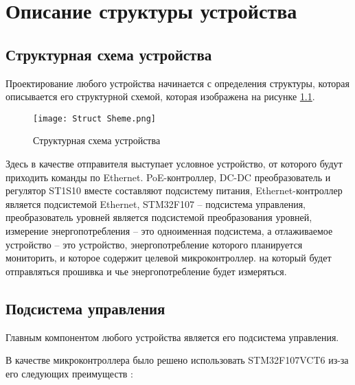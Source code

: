 
\chapter{Описание структуры устройства}

\section{Структурная схема устройства}
\hspace{1cm}

Проектирование любого устройства начинается с определения структуры, которая описывается
его структурной схемой, которая изображена
на рисунке \ref{ris:261}.

\begin{figure}[H]
  \centering
  \texttt{[image: Struct Sheme.png]}
  \caption{Структурная схема устройства}
  \label{ris:261}
\end{figure}

Здесь в качестве отправителя выступает условное устройство, от которого будут приходить
команды по Ethernet. PoE-контроллер, DC-DC преобразователь и регулятор ST1S10 вместе составляют 
подсистему питания,
Ethernet-контроллер является подсистемой Ethernet, STM32F107 -- подсистема управления, 
преобразователь уровней является подсистемой преобразования уровней, измерение энергопотребления --
это одноименная подсистема, а отлаживаемое устройство -- это устройство, энергопотребление которого
планируется мониторить, и которое содержит целевой микроконтроллер.
на который будет отправляться прошивка и чье энергопотребление будет измеряться.

\section{Подсистема управления}
\hspace{1cm} 

Главным компонентом любого устройства является его подсистема управления.

В качестве микроконтроллера было решено использовать
STM32F107VCT6 из-за его следующих преимуществ \cite{STM32:datasheet}:

